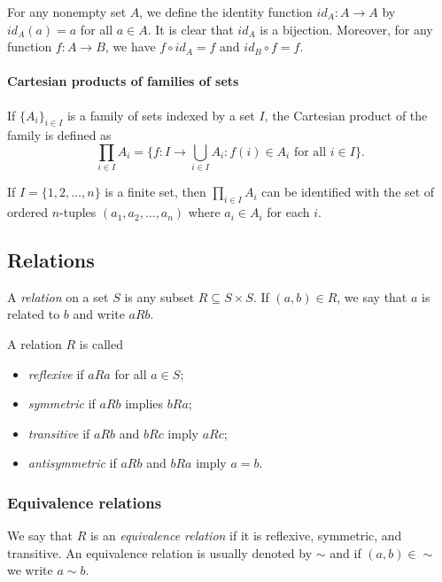 \begin{example}
  For any nonempty set $A$, we define the identity function $id_A:A\to A$ by $id_A(a)=a$ for all $a\in A$.  It is clear that $id_A$ is a bijection.  Moreover, for any function $f:A\to B$, we have $f\circ id_A=f$ and $id_B\circ f=f$.
\end{example}




\paragraph{Cartesian products of families of sets}

If $\{A_i\}_{i\in I}$ is a family of sets indexed by a set $I$, the Cartesian product of the family is defined as
\[\prod_{i\in I} A_i = \{f : I\to \bigcup_{i\in I} A_i : f(i)\in A_i \text{ for all } i\in I\}.\]

\begin{example}
  If $I=\{1,2,\ldots,n\}$ is a finite set, then \(\prod_{i\in I} A_i\) can be identified with the set of ordered \(n\)-tuples \((a_1,a_2,\ldots,a_n)\) where \(a_i\in A_i\) for each \(i\).
\end{example}


\subsection{Relations}

\begin{definition}
  
  A \emph{relation} on a set \(S\) is any subset \(R\subseteq S\times S\).  If \((a,b)\in R\), we say that \(a\) is related to \(b\) and write \(aRb\).
  
  A relation \(R\) is called 
  \begin{itemize}
    \item \emph{reflexive} if \(aRa\) for all \(a\in S\);
    \item \emph{symmetric} if \(aRb\) implies \(bRa\);
    \item \emph{transitive} if \(aRb\) and \(bRc\) imply \(aRc\);
    \item \emph{antisymmetric} if \(aRb\) and \(bRa\) imply \(a=b\).
  \end{itemize}
\end{definition}


\subsubsection{Equivalence relations}
\begin{definition}
  We say that \(R\) is an \emph{equivalence relation} if it is reflexive, symmetric, and transitive. An equivalence relation is usually denoted by \(\sim\) and if $(a,b)\in \sim$ we write $a\sim b$.
\end{definition}


